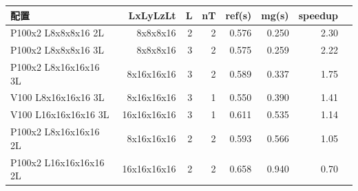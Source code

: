 \begin{tabular}{l|rrrrrrr}
\hline
配置 & LxLyLzLt & L & nT & ref(s) & mg(s) & speedup \\
\hline
P100x2 L8x8x8x16 2L & 8x8x8x16 & 2 & 2 & 0.576 & 0.250 & 2.30 \\
P100x2 L8x8x8x16 3L & 8x8x8x16 & 3 & 2 & 0.575 & 0.259 & 2.22 \\
P100x2 L8x16x16x16 3L & 8x16x16x16 & 3 & 2 & 0.589 & 0.337 & 1.75 \\
V100 L8x16x16x16 3L & 8x16x16x16 & 3 & 1 & 0.550 & 0.390 & 1.41 \\
V100 L16x16x16x16 3L & 16x16x16x16 & 3 & 1 & 0.611 & 0.535 & 1.14 \\
P100x2 L8x16x16x16 2L & 8x16x16x16 & 2 & 2 & 0.593 & 0.566 & 1.05 \\
P100x2 L16x16x16x16 2L & 16x16x16x16 & 2 & 2 & 0.658 & 0.940 & 0.70 \\
\hline
\end{tabular}
